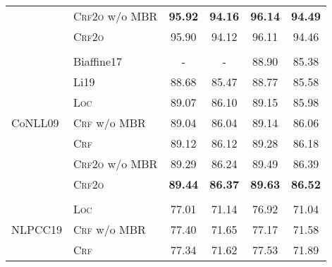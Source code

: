 \begin{table}[tb!]
\begin{tabular}{llcccc}
                             & \textsc{Crf2o} w/o MBR & \textbf{95.92}          & \textbf{94.16}           & \textbf{96.14}                   & \textbf{94.49}                   \\
                             & \textsc{Crf2o}         & 95.90                   & 94.12                    & 96.11                            & 94.46                            \\[2pt]
    \hline
    \\[-15pt]
    \multirow{7}{*}{CoNLL09} & Biaffine17             & -                       & -                        & 88.90                            & 85.38                            \\
                             & Li19                   & 88.68                   & 85.47                    & 88.77                            & 85.58                            \\[3pt]
                             & \textsc{Loc}           & 89.07                   & 86.10                    & 89.15                            & 85.98                            \\
                             & \textsc{Crf} w/o MBR   & 89.04                   & 86.04                    & 89.14                            & 86.06                            \\
                             & \textsc{Crf}           & 89.12                   & 86.12                    & 89.28                            & 86.18\rlap{$^\dagger$}           \\
                             & \textsc{Crf2o} w/o MBR & 89.29                   & 86.24                    & 89.49                            & 86.39                            \\
                             & \textsc{Crf2o}         & \textbf{89.44}          & \textbf{86.37}           & \textbf{89.63}\rlap{$^\ddagger$} & \textbf{86.52}\rlap{$^\ddagger$} \\[2pt]
    \hline
    \\[-15pt]
    \multirow{5}{*}{NLPCC19} & \textsc{Loc}           & 77.01                   & 71.14                    & 76.92                            & 71.04                            \\
                             & \textsc{Crf} w/o MBR   & 77.40                   & 71.65                    & 77.17                            & 71.58                            \\
                             & \textsc{Crf}           & 77.34                   & 71.62                    & 77.53\rlap{$^\ddagger$}          & 71.89\rlap{$^\ddagger$}          \\

\end{tabular}
\end{table}
